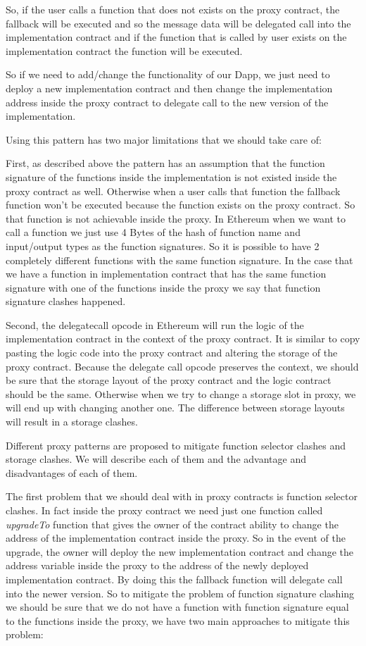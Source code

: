 So, if the user calls a function that does not exists on the proxy contract, the fallback will be executed and so the message data will be delegated call into the implementation contract and if the function that is called by user exists on the implementation contract the function will be executed.

So if we need to add/change the functionality of our Dapp, we just need to deploy a new implementation contract and then change the implementation address inside the proxy contract to delegate call to the new version of the implementation.

Using this pattern has two major limitations that we should take care of:

First, as described above the pattern has an assumption that the function signature of the functions inside the implementation is not existed inside the proxy contract as well. Otherwise when a user calls that function the fallback function won't be executed because the function exists on the proxy contract. So that function is not achievable inside the proxy. In Ethereum when we want to call a function we just use 4 Bytes of the hash of function name and input/output types as the function signatures. So it is possible to have 2 completely different functions with the same function signature. In the case that we have a function in implementation contract that has the same function signature with one of the functions inside the proxy we say that function signature clashes happened.

Second, the delegatecall opcode in Ethereum will run the logic of the implementation contract in the context of the proxy contract. It is similar to copy pasting the logic code into the proxy contract and altering the storage of the proxy contract. Because the delegate call opcode preserves the context, we should be sure that the storage layout of the proxy contract and the logic contract should be the same. Otherwise when we try to change a storage slot in proxy, we will end up with changing another one. The difference between storage layouts will result in a storage clashes. 


Different proxy patterns are proposed to mitigate function selector clashes and storage clashes. We will describe each of them and the advantage and disadvantages of each of them.

The first problem that we should deal with in proxy contracts is function selector clashes. In fact inside the proxy contract we need just one function called \textit{upgradeTo} function that gives the owner of the contract ability to change the address of the implementation contract inside the proxy. So in the event of the upgrade, the owner will deploy the new implementation contract and change the address variable inside the proxy to the address of the newly deployed implementation contract. By doing this the fallback function will delegate call into the newer version. So to mitigate the problem of function signature clashing we should be sure that we do not have a function with function signature equal to the functions inside the proxy, we have two main approaches to mitigate this problem:

